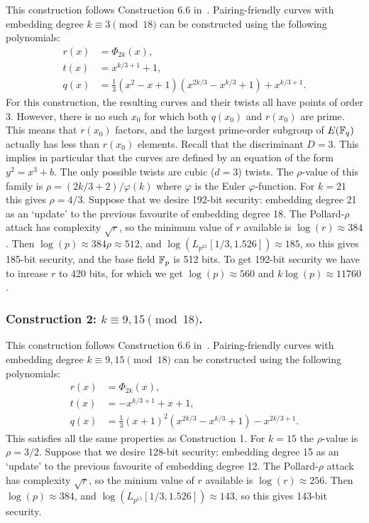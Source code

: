 This construction follows {Construction 6.6} in~\cite{2010/freeman}.
Pairing-friendly curves with embedding degree $k \equiv 3 \pmod{18}$
can be constructed using the following polynomials:
\begin{align*}
r(x) &= \Phi_{2k}(x),	\\
t(x) &= x^{k/3+1} + 1,	\\
q(x) &= \frac{1}{3} (x^2 - x + 1) (x^{2k/3} - x^{k/3} + 1) + x^{k/3+1}.
\end{align*}
For this construction,
the resulting curves and their twists all have points of order 3.
However, there is no such $x_0$ for which
both $q(x_0)$ and $r(x_0)$ are prime.
This means that $r(x_0)$ factors, and the largest prime-order subgroup of $E(\mathbb{F}_{q})$ actually has less than $r(x_0)$ elements.
Recall that the discriminant $D = 3$. 
This implies in particular that the curves are defined by an equation of the form $y^2 = x^3 + b$.
The only possible twists are cubic ($d=3$) twists.
The $\rho$-value of this family is $\rho = (2k/3 + 2)/\varphi(k)$ where $\varphi$ is the Euler $\varphi$-function.
For $k = 21$ this gives $\rho = 4/3$.
Suppose that we desire 192-bit security: embedding degree 21 as an `update' to the previous favourite of embedding degree 18. 
The Pollard-$\rho$ attack has complexity $\sqrt{r}$, so the minimum value of $r$ available is
$\log(r) \approx 384$. Then
$\log(p) \approx 384\rho \approx 512$, and 
$\log(L_{p^{21}}[1/3, 1.526]) \approx 185$,
so this gives 185-bit security, and the base field $\mathbb{F}_{p}$ is 512 bits. 
To get 192-bit security we have to inrease $r$ to 420 bits, 
for which we get $\log(p) \approx 560 $ and
$k\log (p) \approx 11760$.


\subsubsection{Construction 2: $k \equiv 9,15 \pmod{18}$.}
\label{con2}

This construction follows {Construction 6.6} in~\cite{2010/freeman}.
Pairing-friendly curves with embedding degree $k \equiv 9,15 \pmod{18}$
can be constructed using the following polynomials:
\begin{align*}
r(x) &= \Phi_{2k}(x),	\\
t(x) &= -x^{k/3+1} + x + 1,	\\
q(x) &= \frac{1}{3} (x+1)^2 (x^{2k/3} - x^{k/3} + 1) - x^{2k/3+1}.
\end{align*}
This satisfies all the same properties as Construction 1.
For $k=15$ the $\rho$-value is $\rho=3/2$.
Suppose that we desire 128-bit security: embedding degree 15 as an `update' to the previous favourite of embedding degree 12.
The Pollard-$\rho$ attack has complexity $\sqrt{r}$, so the minium value of $r$ available is
$\log(r) \approx 256$. Then
$\log(p) \approx 384$, and
$\log(L_{p^{15}}[1/3, 1.526]) \approx 143$,
so this gives 143-bit security.

